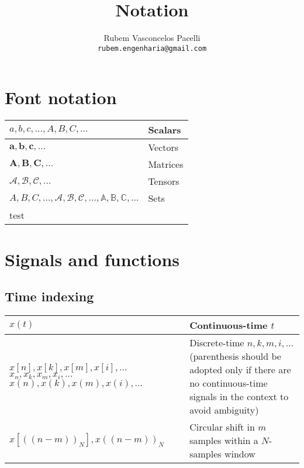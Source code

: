 \documentclass{article}
\begin{document}
\title{\textbf{Notation}  \vspace{-.3cm}}
\author{Rubem Vasconcelos Pacelli\\
  {\tt rubem.engenharia@gmail.com}}
\maketitle

\tableofcontents
\newpage

\section{Font notation}
\begin{xltabular}{\textwidth}{XX}
  $a,b,c, \dots, A, B, C, \dots$                                                                              & Scalars \\ \hline
  $\mathbf{a}, \mathbf{b}, \mathbf{c}, \dots$                                                                 & Vectors \\ \hline
  $\mathbf{A}, \mathbf{B}, \mathbf{C}, \dots$                                                                 & Matrices \\ \hline
  $\bm{\mathcal{A}}, \bm{\mathcal{B}}, \bm{\mathcal{C}}, \dots$                                               & Tensors \\ \hline
  $A, B, C, \dots, \mathcal{A}, \mathcal{B}, \mathcal{C}, \dots, \mathbb{A}, \mathbb{B}, \mathbb{C}, \dots$   & Sets\\
test\end{xltabular}

\section{Signals and functions}
\subsection{Time indexing}
\begin{xltabular}{\textwidth}{p{5.7cm}X}
    \(x(t)\)                                                                                            & Continuous-time \(t\)\\ \hline
    \(x[n], x[k], x[m], x[i], \dots\) \(x_n, x_k, x_m, x_i, \dots\) \(x(n), x(k), x(m), x(i), \dots\)   & Discrete-time \(n, k, m, i, \dots\) (parenthesis should be adopted only if there are no continuous-time signals in the context to avoid ambiguity) \\ \hline
    \(x\left[ \left( \left( n - m \right) \right)_N \right], x \left( \left( n - m \right) \right)_N\)  & Circular shift in \(m\) samples within a \(N\)-samples window \cite{ingleDigitalSignalProcessing2000,oppenheimDiscreteTimeSignalProcessing2009}
\end{xltabular}
\end{document}
